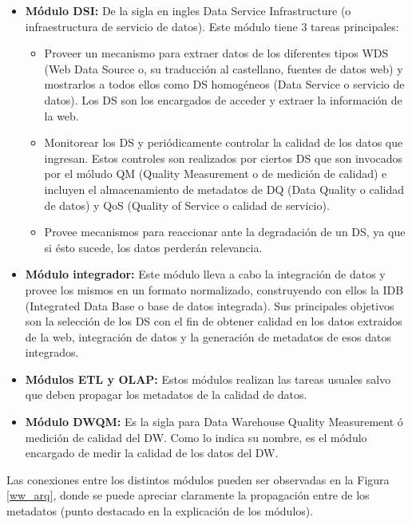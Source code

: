\documentclass[a4paper,11pt]{article}
\begin{document}
    \begin{itemize}
      \item \textbf{Módulo DSI:} De la sigla en ingles Data Service Infrastructure (o infraestructura de servicio de datos). Este módulo tiene 3 tareas
      principales:
        \begin{itemize}
          \item Proveer un mecanismo para extraer datos de los diferentes tipos WDS (Web Data Source o, su traducción al castellano, fuentes de datos web) y
          mostrarlos a todos ellos como DS homogéneos (Data Service o servicio de datos). Los DS son los encargados de acceder y extraer la información de la web.
          \item Monitorear los DS y periódicamente controlar la calidad de los datos que ingresan. Estos controles son realizados por ciertos DS que son
          invocados por el móludo QM (Quality Measurement o de medición de calidad) e incluyen el almacenamiento de metadatos de DQ (Data Quality o calidad de
          datos) y QoS (Quality of Service o calidad de servicio).
          \item Provee mecanismos para reaccionar ante la degradación de un DS, ya que si ésto sucede, los datos perderán relevancia.
        \end{itemize}
      \item \textbf{Módulo integrador:} Este módulo lleva a cabo la integración de datos y provee los mismos en un formato normalizado, construyendo con ellos la
      IDB (Integrated Data Base o base de datos integrada). Sus principales objetivos son la selección de los DS con el fin de obtener calidad en los datos
      extraidos de la web, integración de datos y la generación de metadatos de esos datos integrados.
      \item \textbf{Módulos ETL y OLAP:} Estos módulos realizan las tareas usuales salvo que deben propagar los metadatos de la calidad de datos.
      \item \textbf{Módulo DWQM:} Es la sigla para Data Warehouse Quality Measurement ó medición de calidad del DW. Como lo indica su nombre, es el módulo
      encargado de medir la calidad de los datos del DW.
    \end{itemize}
    
    Las conexiones entre los distintos módulos pueden ser observadas en la Figura \ref{ww_arq}, donde se puede apreciar claramente la propagación entre de los
    metadatos (punto destacado en la explicación de los módulos).
    
\end{document}
